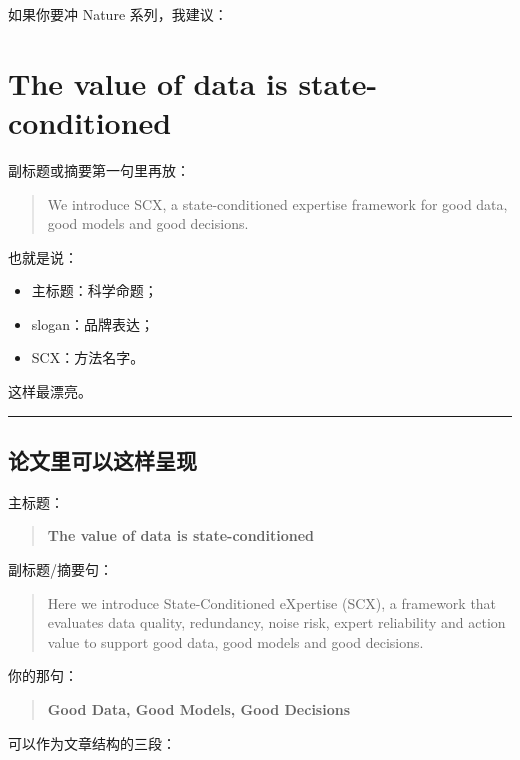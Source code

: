 \documentclass[
  12pt,
]{ctexart}
\providecommand{\tightlist}{%
  \setlength{\itemsep}{0pt}\setlength{\parskip}{0pt}}
\begin{document}
如果你要冲 Nature 系列，我建议：

\section{\texorpdfstring{\textbf{The value of data is
state-conditioned}}{The value of data is state-conditioned}}\label{the-value-of-data-is-state-conditioned}

副标题或摘要第一句里再放：

\begin{quote}
We introduce SCX, a state-conditioned expertise framework for good data,
good models and good decisions.
\end{quote}

也就是说：

\begin{itemize}
\tightlist
\item
  主标题：科学命题；
\item
  slogan：品牌表达；
\item
  SCX：方法名字。
\end{itemize}

这样最漂亮。

\begin{center}\rule{0.5\linewidth}{0.5pt}\end{center}

\subsection{论文里可以这样呈现}\label{ux8bbaux6587ux91ccux53efux4ee5ux8fd9ux6837ux5448ux73b0}

主标题：

\begin{quote}
\textbf{The value of data is state-conditioned}
\end{quote}

副标题/摘要句：

\begin{quote}
Here we introduce State-Conditioned eXpertise (SCX), a framework that
evaluates data quality, redundancy, noise risk, expert reliability and
action value to support good data, good models and good decisions.
\end{quote}

你的那句：

\begin{quote}
\textbf{Good Data, Good Models, Good Decisions}
\end{quote}

可以作为文章结构的三段：
\end{document}
